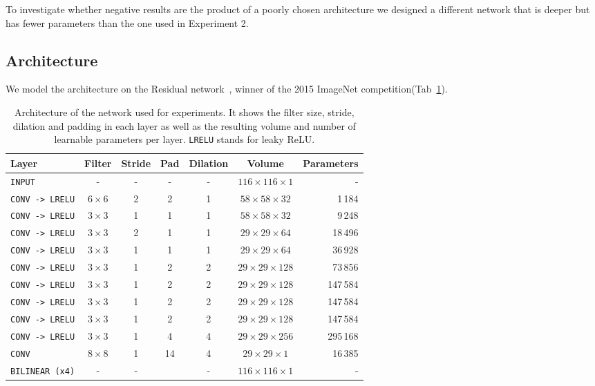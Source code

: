 To investigate whether negative results are the product of a poorly chosen architecture we designed a different network that is deeper but has fewer parameters than the one used in Experiment 2.%

\subsection{Architecture}
We model the architecture on the Residual network~\cite{He2015b}, winner of the 2015 ImageNet competition(Tab~\ref{tab:convNetArchitecture3}).
\begin{table}[h]
	\centering
	\begin{tabular}{lcccccr}
	\hline
	\textbf{Layer} & \textbf{Filter} & \textbf{Stride} & \textbf{Pad} & \textbf{Dilation} & \textbf{Volume} & \textbf{Parameters} \\
	\hline
	\texttt{INPUT}	&- & -	& - & - & $116 \times 116 \times 1$ & -\\
	\texttt{CONV -> LRELU}	& $6 \times 6$ & 2 & 2 & 1 & $58 \times 58 \times 32$ & 1\,184\\
	\texttt{CONV -> LRELU}	& $3 \times 3$ & 1 & 1 & 1 & $58 \times 58 \times 32$ & 9\,248\\
	\texttt{CONV -> LRELU}	& $3 \times 3$ & 2 & 1 & 1 & $29 \times 29 \times 64$ & 18\,496\\
	\texttt{CONV -> LRELU}	& $3 \times 3$ & 1 & 1 & 1 & $29 \times 29 \times 64$ & 36\,928\\
	\texttt{CONV -> LRELU}	& $3 \times 3$ & 1 & 2 & 2 & $29 \times 29 \times 128$ & 73\,856\\
	\texttt{CONV -> LRELU}	& $3 \times 3$ & 1 & 2 & 2 & $29 \times 29 \times 128$ & 147\,584\\
	\texttt{CONV -> LRELU}	& $3 \times 3$ & 1 & 2 & 2 & $29 \times 29 \times 128$ & 147\,584\\
	\texttt{CONV -> LRELU}	& $3 \times 3$ & 1 & 2 & 2 & $29 \times 29 \times 128$ & 147\,584\\
	\texttt{CONV -> LRELU}	& $3 \times 3$ & 1 & 4 & 4 & $29 \times 29 \times 256$ & 295\,168\\
	\texttt{CONV}	& $8 \times 8$ & 1 & 14 & 4 & $29 \times 29 \times 1$ & 16\,385\\
	\texttt{BILINEAR (x4)}		& - & - && - & $116 \times 116 \times 1$ & -\\
	\hline
	\end{tabular}
	\caption[Convolutional network architecture for Experiment 3]{Architecture of the network used for experiments. It shows the filter size, stride, dilation and padding in each layer as well as the resulting volume and number of learnable parameters per layer. \texttt{LRELU} stands for leaky ReLU.}
	\label{tab:convNetArchitecture3}
\end{table}
